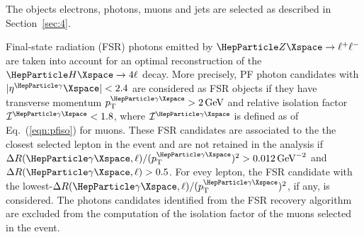 
The objects electrons, photons, muons and jets are selected as described in Section~\ref{sec:4}.


Final-state radiation (FSR) photons emitted by $\PZ\rightarrow \ell^+\ell^-$ are taken into account for an optimal reconstruction of the $\PH\rightarrow4\ell$ decay. More precisely, PF photon candidates with $\abs{\eta^\Pgg}<2.4$ are considered as FSR objects if they have transverse momentum $\pt^{\Pgg} > 2 \GeV$ and relative isolation factor ${\mathcal I}^{\Pgg} <1.8$, where ${\mathcal I}^{\Pgg}$ is defined as of Eq.~(\ref{eqn:pfiso}) for muons.
These FSR candidates are associated to the the closest selected lepton in the event and are not retained in the analysis if $\Delta R(\Pgg,\ell)/(\pt^{\Pgg})^2>0.012 \GeV^{-2}$ and $\Delta R(\Pgg,\ell) > 0.5$.
For evey lepton, the FSR candidate with the lowest-$\Delta R(\Pgg,\ell)/(\pt^{\Pgg})^2$, if any, is considered.
The photons candidates identified from the FSR recovery algorithm are excluded from the computation of the isolation factor of the muons selected in the event.


